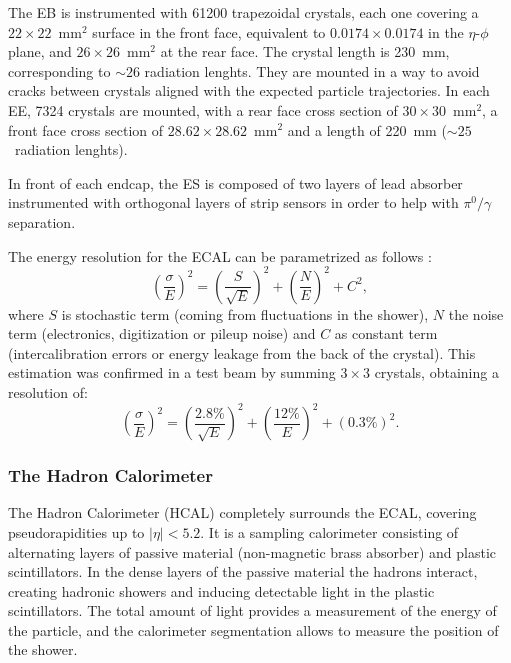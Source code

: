 \documentclass[../main.tex]{subfiles}
\begin{document}
The EB is instrumented with 61200 trapezoidal crystals, each one covering a $22\times22$~mm${}^2$ surface in the front face, equivalent to $0.0174\times 0.0174$ in the $\eta$-$\phi$ plane, and $26\times26$~mm${}^2$ at the rear face. The crystal length is 230~mm, corresponding to $\sim26$ radiation lenghts. They are mounted in a way to avoid cracks between crystals aligned with the expected particle trajectories. In each EE, 7324 crystals are mounted, with a rear face cross section of $30\times30$~mm${}^2$, a front face cross section of $28.62\times28.62$~mm${}^2$ and a length of 220~mm ($\sim25$~radiation lenghts).

In front of each endcap, the ES is composed of two layers of lead absorber instrumented with orthogonal layers of strip sensors in order to help with $\pi^0/\gamma$ separation.

The energy resolution for the ECAL can be parametrized as follows \cite{intro:exp:cms}:
\begin{equation}
\left(\frac{\sigma}{E}\right)^2 = \left(\frac{S}{\sqrt{E}}\right)^2 + \left(\frac{N}{E}\right)^2 + C^2,
\end{equation}
where $S$ is stochastic term (coming from fluctuations in the shower), $N$ the noise term (electronics, digitization or pileup noise) and $C$ as constant term (intercalibration errors or energy leakage from the back of the crystal). This estimation was confirmed in a test beam by summing $3\times3$ crystals, obtaining a resolution of:
\begin{equation}
\left(\frac{\sigma}{E}\right)^2 = \left(\frac{2.8\%}{\sqrt{E}}\right)^2 + \left(\frac{12\%}{E}\right)^2 + (0.3\%)^2.
\end{equation}

\subsubsection{The Hadron Calorimeter}

The Hadron Calorimeter (HCAL) \cite{intro:exp:hcal} completely surrounds the ECAL, covering pseudorapidities up to $|\eta|<5.2$. It is a sampling calorimeter consisting of alternating layers of passive material (non-magnetic brass absorber) and plastic scintillators. In the dense layers of the passive material the hadrons interact, creating hadronic showers and inducing detectable light in the plastic scintillators. The total amount of light provides a measurement of the energy of the particle, and the calorimeter segmentation allows to measure the position of the shower.
\end{document}
